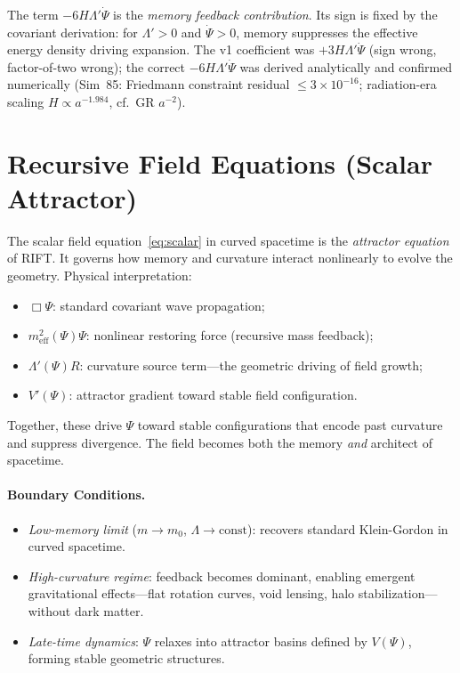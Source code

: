 \documentclass[12pt,a4paper]{article}
\begin{document}
The term $-6H\Lambda'\dot\Psi$ is the \emph{memory feedback contribution}. Its sign
is fixed by the covariant derivation: for $\Lambda' > 0$ and $\dot\Psi > 0$, memory
suppresses the effective energy density driving expansion. The v1 coefficient was
$+3H\Lambda'\dot\Psi$ (sign wrong, factor-of-two wrong); the correct
$-6H\Lambda'\dot\Psi$ was derived analytically and confirmed numerically
(Sim~85: Friedmann constraint residual $\leq 3\times 10^{-16}$;
radiation-era scaling $H\propto a^{-1.984}$, cf.\ GR $a^{-2}$).

\section{Recursive Field Equations (Scalar Attractor)}
\label{sec:attractor}

The scalar field equation~\eqref{eq:scalar} in curved spacetime is the
\emph{attractor equation} of RIFT. It governs how memory and curvature
interact nonlinearly to evolve the geometry. Physical interpretation:
\begin{itemize}
  \item $\Box\Psi$: standard covariant wave propagation;
  \item $m_{\mathrm{eff}}^2(\Psi)\Psi$: nonlinear restoring force (recursive mass feedback);
  \item $\Lambda'(\Psi)R$: curvature source term---the geometric driving of field growth;
  \item $V'(\Psi)$: attractor gradient toward stable field configuration.
\end{itemize}
Together, these drive $\Psi$ toward stable configurations that encode past
curvature and suppress divergence. The field becomes both the memory
\emph{and} architect of spacetime.

\paragraph{Boundary Conditions.}
\begin{itemize}
  \item \emph{Low-memory limit} ($m \to m_0$, $\Lambda \to \mathrm{const}$): recovers standard Klein-Gordon in curved spacetime.
  \item \emph{High-curvature regime}: feedback becomes dominant, enabling emergent gravitational effects---flat rotation curves, void lensing, halo stabilization---without dark matter.
  \item \emph{Late-time dynamics}: $\Psi$ relaxes into attractor basins defined by $V(\Psi)$, forming stable geometric structures.
\end{itemize}
\end{document}

